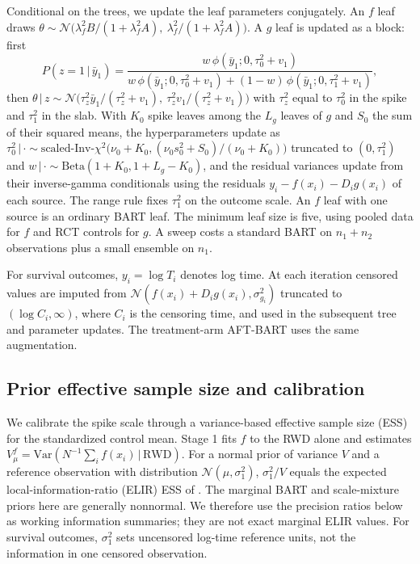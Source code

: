 \documentclass[11pt]{article}
\newcommand{\Var}{\mathrm{Var}}
\newcommand{\Normal}{\mathcal{N}}
\newcommand{\given}{\,\vert\,}
\theoremstyle{definition}
\theoremstyle{plain}
\begin{document}
Conditional on the trees, we update the leaf parameters conjugately. An $f$ leaf draws $\theta\sim\Normal\bigl(\lambda_f^2B/(1+\lambda_f^2A),\ \lambda_f^2/(1+\lambda_f^2A)\bigr)$. A $g$ leaf is updated as a block: first
\begin{equation}
P(z=1\given\bar y_1)=\frac{w\,\phi(\bar y_1;0,\tau_0^2+v_1)}{w\,\phi(\bar y_1;0,\tau_0^2+v_1)+(1-w)\,\phi(\bar y_1;0,\tau_1^2+v_1)},
\label{eq:zpost}
\end{equation}
then $\theta\given z\sim\Normal\bigl(\tau_z^2\bar y_1/(\tau_z^2+v_1),\ \tau_z^2v_1/(\tau_z^2+v_1)\bigr)$ with $\tau_z^2$ equal to $\tau_0^2$ in the spike and $\tau_1^2$ in the slab. With $K_0$ spike leaves among the $L_g$ leaves of $g$ and $S_0$ the sum of their squared means, the hyperparameters update as $\tau_0^2\given\cdot\sim\text{scaled-Inv-}\chi^2\bigl(\nu_0+K_0,(\nu_0s_0^2+S_0)/(\nu_0+K_0)\bigr)$ truncated to $(0,\tau_1^2)$ and $w\given\cdot\sim\mathrm{Beta}(1+K_0,1+L_g-K_0)$, and the residual variances update from their inverse-gamma conditionals using the residuals $y_i-f(x_i)-D_ig(x_i)$ of each source. The range rule fixes $\tau_1^2$ on the outcome scale. An $f$ leaf with one source is an ordinary BART leaf. The minimum leaf size is five, using pooled data for $f$ and RCT controls for $g$. A sweep costs a standard BART on $n_1+n_2$ observations plus a small ensemble on $n_1$.

For survival outcomes, $y_i=\log T_i$ denotes log time. At each iteration censored values are imputed from $\Normal(f(x_i)+D_ig(x_i),\sigma_{g_i}^2)$ truncated to $(\log C_i,\infty)$, where $C_i$ is the censoring time, and used in the subsequent tree and parameter updates. The treatment-arm AFT-BART uses the same augmentation.

\subsection{Prior effective sample size and calibration}
\label{sec:ess}

We calibrate the spike scale through a variance-based effective sample size (ESS) for the standardized control mean. Stage 1 fits $f$ to the RWD alone and estimates $V_\mu^f=\Var(N^{-1}\sum_i f(x_i)\given\text{RWD})$. For a normal prior of variance $V$ and a reference observation with distribution $\Normal(\mu,\sigma_1^2)$, $\sigma_1^2/V$ equals the expected local-information-ratio (ELIR) ESS of \citet{neuenschwander2020}. The marginal BART and scale-mixture priors here are generally nonnormal. We therefore use the precision ratios below as working information summaries; they are not exact marginal ELIR values. For survival outcomes, $\sigma_1^2$ sets uncensored log-time reference units, not the information in one censored observation.
\end{document}
